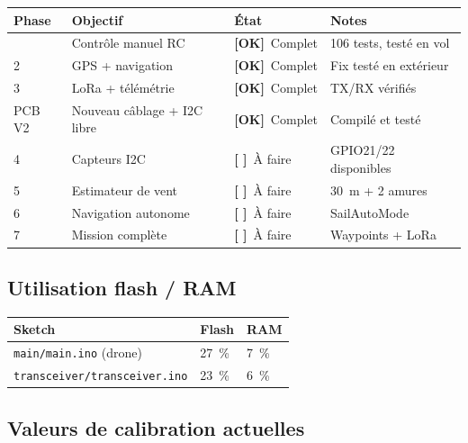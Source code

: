 \documentclass[12pt,a4paper]{article}
\newcommand{\file}[1]{\texttt{#1}}
\newcommand{\done}{\textcolor{okborder}{\textbf{[OK]}}}
\newcommand{\todo}{\textcolor{warnborder}{\textbf{[ ]}}}
\begin{document}
\begin{longtable}{C{1.5cm} L{5cm} C{2cm} L{4.5cm}}
  \toprule
  \textcolor{tableheadfg}{\textbf{Phase}} &
  \textcolor{tableheadfg}{\textbf{Objectif}} &
  \textcolor{tableheadfg}{\textbf{État}} &
  \textcolor{tableheadfg}{\textbf{Notes}} \\
  \midrule
  \endhead
  \bottomrule
   & Contrôle manuel RC & \done\ Complet & 106 tests, testé en vol \\[3pt]
  2 & GPS + navigation & \done\ Complet & Fix testé en extérieur \\[3pt]
  3 & LoRa + télémétrie & \done\ Complet & TX/RX vérifiés \\[3pt]
  PCB V2 & Nouveau câblage + I2C libre & \done\ Complet & Compilé et testé \\[3pt]
  4 & Capteurs I2C & \todo\ À faire & GPIO21/22 disponibles \\[3pt]
  5 & Estimateur de vent & \todo\ À faire & 30~m + 2 amures \\[3pt]
  6 & Navigation autonome & \todo\ À faire & SailAutoMode \\[3pt]
  7 & Mission complète & \todo\ À faire & Waypoints + LoRa \\
\end{longtable}

\subsection{Utilisation flash / RAM}

\begin{longtable}{L{5cm} C{2.5cm} C{2.5cm}}
  \toprule
  \textcolor{tableheadfg}{\textbf{Sketch}} &
  \textcolor{tableheadfg}{\textbf{Flash}} &
  \textcolor{tableheadfg}{\textbf{RAM}} \\
  \midrule
  \endhead
  \bottomrule
  \endfoot
  \file{main/main.ino} (drone) & 27~\% & 7~\% \\[3pt]
  \file{transceiver/transceiver.ino} & 23~\% & 6~\% \\
\end{longtable}

\subsection{Valeurs de calibration actuelles}
\end{document}
